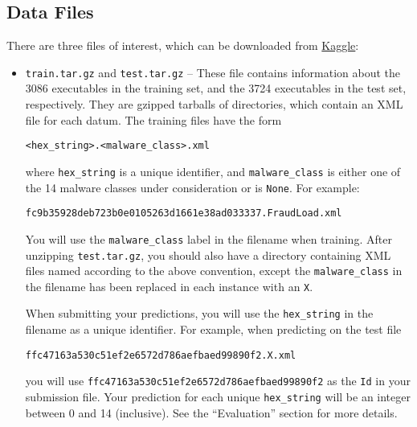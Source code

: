\documentclass[12pt]{article}
\begin{document}
\subsection*{Data Files}
There are three files of interest, which can be downloaded from \href{https://inclass.kaggle.com/c/cs-181-classification-practical/data}{Kaggle}:
\begin{itemize}
\item \verb|train.tar.gz| and \verb|test.tar.gz| -- These file contains information about the 3086 executables in the training set, and the 3724 executables in the test set, respectively. They are gzipped tarballs of directories, which contain an XML file for each datum.  The training files have the form
\begin{center}
\verb|<hex_string>.<malware_class>.xml|
\end{center}
where \verb|hex_string| is a unique identifier, and \verb|malware_class| is either one of the 14 malware classes under consideration or is \verb|None|. For example:
\begin{center}
\verb|fc9b35928deb723b0e0105263d1661e38ad033337.FraudLoad.xml|
\end{center}
You will use the \verb|malware_class| label in the filename when training.  After unzipping \verb|test.tar.gz|, you should also have a directory containing XML files named according to the above convention, except the \verb|malware_class| in the filename has been replaced in each instance with an \verb|X|.

When submitting your predictions, you will use the \verb|hex_string| in the filename as a unique identifier.  For example, when predicting on the test file
\begin{center}
\verb|ffc47163a530c51ef2e6572d786aefbaed99890f2.X.xml|
\end{center}
you will use \verb|ffc47163a530c51ef2e6572d786aefbaed99890f2| as the \verb|Id| in your submission  file. Your prediction for each unique \verb|hex_string| will be an integer between 0 and 14 (inclusive).  See the ``Evaluation'' section for more details.


\end{itemize}
\end{document}
